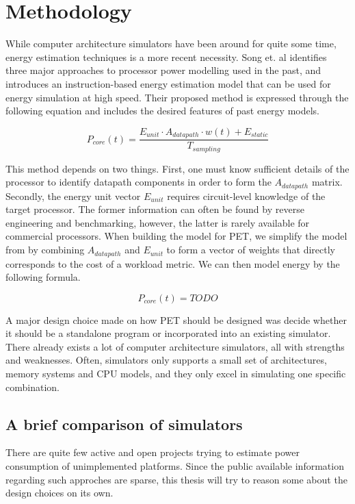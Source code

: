 \section{Methodology}

While computer architecture simulators have been around for quite some time,
energy estimation techniques is a more recent necessity. Song et. al
\cite{song2012instruction} identifies three major approaches to processor power
modelling used in the past, and introduces an instruction-based energy
estimation model that can be used for energy simulation at high speed. Their
proposed method is expressed through the following equation and includes the
desired features of past energy models.

\[
    P_{core}(t) = \frac{E_{unit} \cdot A_{datapath} \cdot w(t) +
    E_{static}}{T_{sampling}}
\]

This method depends on two things. First, one must know sufficient details of
the processor to identify datapath components in order to form the
$A_{datapath}$ matrix. Secondly, the energy unit vector $E_{unit}$ requires
circuit-level knowledge of the target processor. The former information can
often be found by reverse engineering and benchmarking, however, the latter is
rarely available for commercial processors. When building the model for PET, we
simplify the model from \cite{song2012instruction} by combining
$A_{datapath}$ and $E_{unit}$ to form a vector of weights that directly
corresponds to the cost of a workload metric. We can then model energy by the
following formula.

\[
    P_{core}(t) = TODO
\]


A major design choice made on how PET should be designed was decide whether it
should be a standalone program or incorporated into an existing simulator.
There already exists a lot of computer architecture simulators, all with
strengths and weaknesses. Often, simulators only supports a small set of
architectures, memory systems and CPU models, and they only excel in simulating
one specific combination.

\subsection{A brief comparison of simulators}
\label{subsec:design_choices}
There are quite few active and open projects trying to estimate power
consumption of unimplemented platforms. Since the public available information
regarding such approches are sparse, this thesis will try to reason some about
the design choices on its own.


